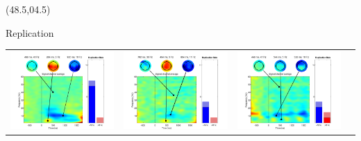 \documentclass[final]{beamer}
\begin{document}
\begin{frame}{}
\begin{textblock}{69}(48.5,04.5)
\begin{block}{Replication}
\small \centering 
\begin{tabular}{c c c c}
\includegraphics{gamma01}      & \includegraphics{gamma02} & \includegraphics{gamma03}              & \multirow{4}{3cm}{\begin{sideways}\begin{minipage}{35cm}\small

\end{minipage}
\end{sideways}}
\end{tabular}
\end{block}
\end{textblock}
\end{frame}
\end{document}
